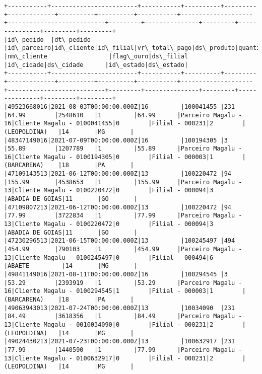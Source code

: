 \documentclass[11pt]{article}
\begin{document}
    \begin{Verbatim}[commandchars=\\\{\}]
+-----------+------------------------+-----------+----------+---------+-------------+----------+----------+-----------+--------------------+---------------------------+---------+---------------+---------+---------------+---------+---------+
|id\_pedido  |dt\_pedido               |id\_parceiro|id\_cliente|id\_filial|vr\_total\_pago|ds\_produto|quantidade|vr\_unitario|nm\_parceiro         |nm\_cliente                 |flag\_ouro|ds\_filial      |id\_cidade|ds\_cidade      |id\_estado|ds\_estado|
+-----------+------------------------+-----------+----------+---------+-------------+----------+----------+-----------+--------------------+---------------------------+---------+---------------+---------+---------------+---------+---------+
|49523668016|2021-08-03T00:00:00.000Z|16         |100041455 |231      |64.99        |2548610   |1         |64.99      |Parceiro Magalu - 16|Cliente Magalu - 0100041455|0        |Filial - 000231|2        |(LEOPOLDINA)   |14       |MG       |
|48347149016|2021-07-09T00:00:00.000Z|16         |100194305 |3        |55.89        |1207789   |1         |55.89      |Parceiro Magalu - 16|Cliente Magalu - 0100194305|0        |Filial - 000003|1        |(BARCARENA)    |18       |PA       |
|47109143513|2021-06-12T00:00:00.000Z|13         |100220472 |94       |155.99       |4538653   |1         |155.99     |Parceiro Magalu - 13|Cliente Magalu - 0100220472|0        |Filial - 000094|3        |ABADIA DE GOIAS|11       |GO       |
|47109807213|2021-06-12T00:00:00.000Z|13         |100220472 |94       |77.99        |3722834   |1         |77.99      |Parceiro Magalu - 13|Cliente Magalu - 0100220472|0        |Filial - 000094|3        |ABADIA DE GOIAS|11       |GO       |
|47230296513|2021-06-15T00:00:00.000Z|13         |100245497 |494      |454.99       |790103    |1         |454.99     |Parceiro Magalu - 13|Cliente Magalu - 0100245497|0        |Filial - 000494|6        |ABAETE         |14       |MG       |
|49841149016|2021-08-11T00:00:00.000Z|16         |100294545 |3        |53.29        |2393919   |1         |53.29      |Parceiro Magalu - 16|Cliente Magalu - 0100294545|1        |Filial - 000003|1        |(BARCARENA)    |18       |PA       |
|49063943013|2021-07-24T00:00:00.000Z|13         |10034090  |231      |84.49        |3618356   |1         |84.49      |Parceiro Magalu - 13|Cliente Magalu - 0010034090|0        |Filial - 000231|2        |(LEOPOLDINA)   |14       |MG       |
|49024430213|2021-07-23T00:00:00.000Z|13         |100632917 |231      |77.99        |1440590   |1         |77.99      |Parceiro Magalu - 13|Cliente Magalu - 0100632917|0        |Filial - 000231|2        |(LEOPOLDINA)   |14       |MG       |

\end{Verbatim}
\end{document}
